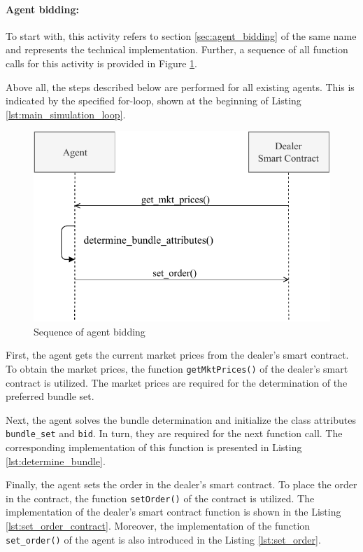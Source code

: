 \paragraph{Agent bidding:}
To start with, this activity refers to section \ref{sec:agent_bidding} of the same name and represents
the technical implementation. Further, a sequence of all function 
calls for this activity is provided in Figure \ref{figure:agent_bidding_figure}.

Above all, the steps described below are performed for all existing agents. 
This is indicated by the specified for-loop, shown at the beginning of Listing \ref{lst:main_simulation_loop}.

\begin{figure}[htbp]
	\centering
	\includegraphics[width=.8\linewidth]{./figures/agent_bidding.pdf}
	\caption{Sequence of agent bidding}
	\label{figure:agent_bidding_figure}
\end{figure}

First, the agent gets the current market prices from the dealer's smart contract.
To obtain the market prices, the function \verb|getMktPrices()| of the dealer's smart contract is utilized.
The market prices are required for the determination of the preferred bundle set.

Next, the agent solves the bundle determination and initialize the class attributes
\verb|bundle_set| and \verb|bid|.
In turn, they are required for the next function call.
The corresponding implementation of this function is presented in Listing \ref{lst:determine_bundle}.

Finally, the agent sets the order in the dealer's smart contract.
To place the order in the contract, the function \verb|setOrder()| of the contract is utilized.
The implementation of the dealer's smart contract function is shown in the Listing \ref{lst:set_order_contract}.
Moreover, the implementation of the function \verb|set_order()| of the agent is 
also introduced in the Listing \ref{lst:set_order}.

